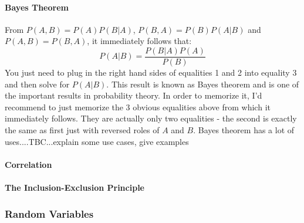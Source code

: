 



\paragraph{Bayes Theorem}
From $P(A, B) = P(A) P(B|A)$,  $P(B, A) = P(B) P(A|B)$ and $P(A, B) = P(B, A)$, it immediately follows that:
\begin{equation}
\label{Eq:BayesTheorem}
 P(A|B) = \frac{P(B|A) P(A)}{P(B)}
\end{equation}
You just need to plug in the right hand sides of equalities 1 and 2 into equality 3 and then solve for $ P(A|B)$. This result is known as Bayes theorem and is one of the important results in probability theory. In order to memorize it, I'd recommend to just memorize the 3 obvious equalities above from which it immediately follows. They are actually only two equalities - the second is exactly the same as first just with reversed roles of $A$ and $B$. Bayes theorem has a lot of uses....TBC...explain some use cases, give examples







\paragraph{Correlation}


\paragraph{The Inclusion-Exclusion Principle}





\subsubsection{Random Variables}



